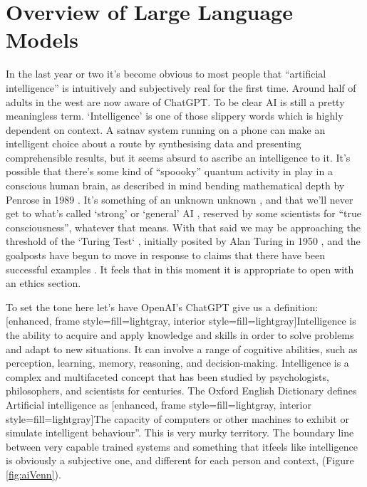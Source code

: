 
\section{Overview of Large Language Models}
In the last year or two it's become obvious to most people that ``artificial intelligence'' is intuitively and subjectively real for the first time. Around half of adults in the west are now aware of ChatGPT. To be clear AI is still a pretty meaningless term. `Intelligence' is one of those slippery words which is highly dependent on context. A satnav system running on a phone can make an intelligent choice about a route by synthesising data and presenting comprehensible results, but it seems absurd to ascribe an intelligence to it. It's possible that there's some kind of ``spoooky'' quantum activity in play in a conscious human brain, as described in mind bending mathematical depth by Penrose in 1989 \cite{penrose1990emperor}. It's something of an unknown unknown \cite{kerskens2022experimental}, and that we'll never get to what's called `strong' or `general' AI \cite{larson2021myth, searle1980minds}, reserved by some scientists for ``true consciousness'', whatever that means. With that said we may be approaching the threshold of the `Turing Test` \cite{sep-turing-test}, initially posited by Alan Turing in 1950 \cite{turing1950computing}, and the goalposts have begun to move in response to claims that there have been successful examples \cite{warwick2016can, french2012moving, french2000turing, searle2009turing}. It feels that in this moment it is appropriate to open with an ethics section.\par
To set the tone here let's have OpenAI's ChatGPT give us a definition:
[enhanced, frame style={fill=lightgray}, interior style={fill=lightgray}]Intelligence is the ability to acquire and apply knowledge and skills in order to solve problems and adapt to new situations. It can involve a range of cognitive abilities, such as perception, learning, memory, reasoning, and decision-making. Intelligence is a complex and multifaceted concept that has been studied by psychologists, philosophers, and scientists for centuries.
The Oxford English Dictionary defines Artificial intelligence as 
[enhanced, frame style={fill=lightgray}, interior style={fill=lightgray}]The capacity of computers or other machines to exhibit or simulate intelligent behaviour''.
This is very murky territory. The boundary line between very capable trained systems and something that it{feels} like intelligence is obviously a subjective one, and different for each person and context, (Figure \ref{fig:aiVenn}).\par

